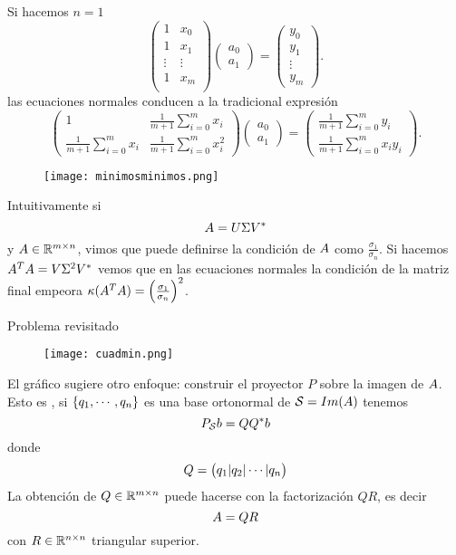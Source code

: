 Si hacemos $n=1$
$$
 \begin{pmatrix}
 1&x_{0}\\
 1&x_{1}\\
 \vdots&\vdots\\
 1&x_{m}\\
 \end{pmatrix}
 \begin{pmatrix}
 a_{0}\\
 a_{1}
 \end{pmatrix}=
 \begin{pmatrix}
y_{0}\\
 y_{1}\\
 \vdots\\
 y_{m}
 \end{pmatrix}.
 $$
las ecuaciones normales conducen a la tradicional expresión
$$
\begin{pmatrix}
1&\frac{1}{m+1}\sum_{i=0}^mx_i\\
\frac{1}{m+1}\sum_{i=0}^mx_i&\frac{1}{m+1}\sum_{i=0}^mx_i^2
\end{pmatrix}
\begin{pmatrix}
 a_{0}\\
 a_{1}
 \end{pmatrix}=
 \begin{pmatrix}
\frac{1}{m+1}\sum_{i=0}^my_i\\
 \frac{1}{m+1}\sum_{i=0}^mx_iy_i
 \end{pmatrix}.
$$

 \begin{figure}[h]
\centering\texttt{[image: minimosminimos.png]}
\end{figure}

 Intuitivamente si
 $$
 \Ab=\Ub\Sigma\Vb^*
 $$
 y $\Ab\in \R^{m\times n}$, vimos que puede definirse la condición de $\Ab$ como $\frac{\sigma_1}{\sigma_n}$. Si hacemos $\Ab^T\Ab=\Vb\Sigma^2\Vb^*$ vemos que en las ecuaciones normales la condición de la matriz final empeora $\kappa(\Ab^T\Ab)=\left(\frac{\sigma_1}{\sigma_n}\right)^2$.

Problema revisitado
\begin{figure}[h]
\centering\texttt{[image: cuadmin.png]}
\end{figure}

El gráfico sugiere otro enfoque: construir el proyector $P$ sobre la imagen de $\Ab$. Esto es , si $\{\qb_1,\cdots,\qb_n\}$ es una base ortonormal de $\mathcal{S}=Im(\Ab)$ tenemos
$$
P_{\mathcal{S}}\bb=\Qb\Qb^*\bb
$$
donde
$$
\Qb=
\begin{pmatrix}
\qb_1|\qb_2|\cdots |\qb_n
\end{pmatrix}
$$
La obtención de $\Qb\in \R^{m\times n}$ puede hacerse con la factorización $QR$, es decir
$$
\Ab=\Qb\Rb
$$
con $\Rb\in \R^{n\times n}$ triangular superior.

